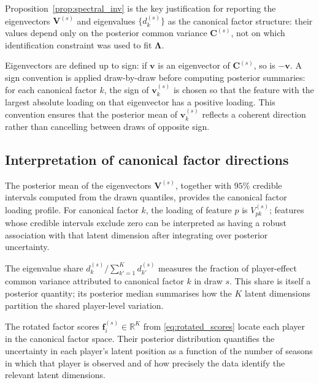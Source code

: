Proposition~\ref{prop:spectral_inv} is the key justification for reporting the eigenvectors $\mathbf{V}^{(s)}$ and eigenvalues $\{d_k^{(s)}\}$ as the canonical factor structure: their values depend only on the posterior common variance $\mathbf{C}^{(s)}$, not on which identification constraint was used to fit $\boldsymbol{\Lambda}$.

\begin{remark}
\label{rem:sign}
Eigenvectors are defined up to sign: if $\mathbf{v}$ is an eigenvector of $\mathbf{C}^{(s)}$, so is $-\mathbf{v}$. A sign convention is applied draw-by-draw before computing posterior summaries: for each canonical factor $k$, the sign of $\mathbf{v}_k^{(s)}$ is chosen so that the feature with the largest absolute loading on that eigenvector has a positive loading. This convention ensures that the posterior mean of $\mathbf{v}_k^{(s)}$ reflects a coherent direction rather than cancelling between draws of opposite sign.
\end{remark}

\subsection{Interpretation of canonical factor directions}

The posterior mean of the eigenvectors $\mathbf{V}^{(s)}$, together with $95\%$ credible intervals computed from the drawn quantiles, provides the canonical factor loading profile. For canonical factor $k$, the loading of feature $p$ is $V_{pk}^{(s)}$; features whose credible intervals exclude zero can be interpreted as having a robust association with that latent dimension after integrating over posterior uncertainty.

The eigenvalue share $d_k^{(s)} / \sum_{k'=1}^K d_{k'}^{(s)}$ measures the fraction of player-effect common variance attributed to canonical factor $k$ in draw $s$. This share is itself a posterior quantity; its posterior median summarises how the $K$ latent dimensions partition the shared player-level variation.

The rotated factor scores $\mathbf{f}_i^{(s)} \in \mathbb{R}^K$ from \eqref{eq:rotated_scores} locate each player in the canonical factor space. Their posterior distribution quantifies the uncertainty in each player's latent position as a function of the number of seasons in which that player is observed and of how precisely the data identify the relevant latent dimensions.
